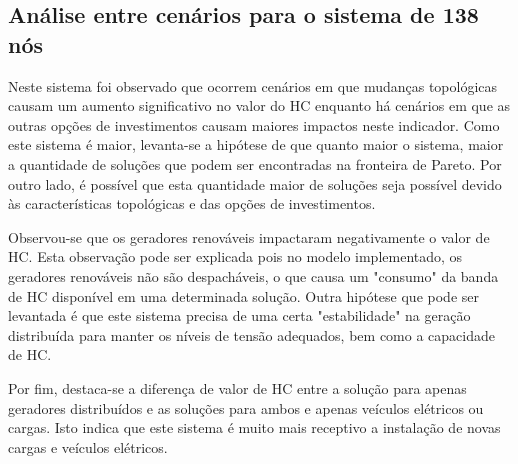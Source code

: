 \subsection{Análise entre cenários para o sistema de 138 nós}

Neste sistema foi observado que ocorrem cenários em que mudanças topológicas causam um aumento significativo no valor do \ac{HC} enquanto há cenários em que as outras opções de investimentos causam maiores impactos neste indicador. Como este sistema é maior, levanta-se a hipótese de que quanto maior o sistema, maior a quantidade de soluções que podem ser encontradas na fronteira de Pareto. Por outro lado, é possível que esta quantidade maior de soluções seja possível devido às características topológicas e das opções de investimentos.

Observou-se que os geradores renováveis impactaram negativamente o valor de \ac{HC}. Esta observação pode ser explicada pois no modelo implementado, os geradores renováveis não são despacháveis, o que causa um "consumo" da banda de \ac{HC} disponível em uma determinada solução. Outra hipótese que pode ser levantada é que este sistema precisa de uma certa "estabilidade"\; na geração distribuída para manter os níveis de tensão adequados, bem como a capacidade de \ac{HC}.

Por fim, destaca-se a diferença de valor de \ac{HC} entre a solução para apenas geradores distribuídos e as soluções para ambos e apenas veículos elétricos ou cargas. Isto indica que este sistema é muito mais receptivo a instalação de novas cargas e veículos elétricos.





